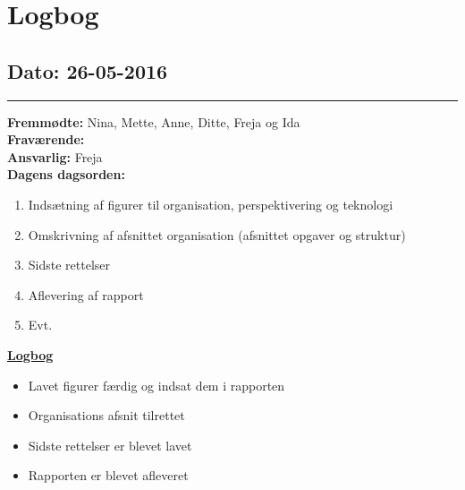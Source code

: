 \chapter{Logbog}
\section{Dato: 26-05-2016}
\hrule
\textbf{Fremmødte:} Nina, Mette, Anne, Ditte, Freja og Ida  \\
\textbf{Fraværende: } \\
\textbf{Ansvarlig:} Freja  \\
\textbf{Dagens dagsorden: }
\begin{enumerate}
\item Indsætning af figurer til organisation, perspektivering og teknologi
\item Omskrivning af afsnittet organisation (afsnittet opgaver og struktur) 
\item Sidste rettelser
\item Aflevering af rapport
\item Evt. 
\end{enumerate}

\underline{\textbf{Logbog}}
\begin{itemize}
\item Lavet figurer færdig og indsat dem i rapporten
\item Organisations afsnit tilrettet
\item Sidste rettelser er blevet lavet
\item Rapporten er blevet afleveret
\end{itemize}
\newpage